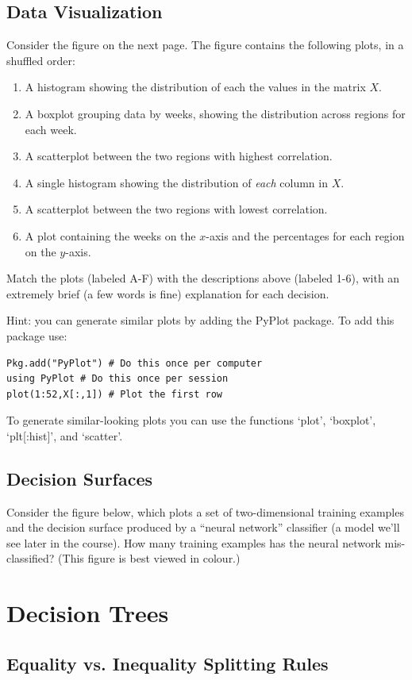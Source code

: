 \documentclass{article}
\def\blu#1{{\color{blu}#1}}
\def\enum#1{\begin{enumerate}#1\end{enumerate}}
\begin{document}
\subsection{Data Visualization}

Consider the figure on the next page.
The figure contains the following plots, in a shuffled order:
\enum{
\item A histogram showing the distribution of each the values in the matrix $X$.
\item A boxplot grouping data by weeks, showing the distribution across regions for each week.
\item A scatterplot between the two regions with highest correlation.
\item A single histogram showing the distribution of \emph{each} column in $X$.
\item A scatterplot between the two regions with lowest correlation.
\item A plot containing the weeks on the $x$-axis and the percentages for each region on the $y$-axis.
}
\blu{Match the plots (labeled A-F) with the descriptions above (labeled 1-6), with an extremely brief (a few words is fine) explanation for each decision.}

Hint: you can generate similar plots by adding the PyPlot package. To add this package use:
\begin{verbatim}
Pkg.add("PyPlot") # Do this once per computer
using PyPlot # Do this once per session
plot(1:52,X[:,1]) # Plot the first row
\end{verbatim}
To generate similar-looking plots you can use the functions `plot', `boxplot', `plt[:hist]', and `scatter'.


\subsection{Decision Surfaces}

Consider the figure below, which plots a set of two-dimensional training examples and the decision surface produced by a ``neural network'' classifier (a model we'll see later in the course).
\blu{How many training examples has the neural network mis-classified?} (This figure is best viewed in colour.)

\section{Decision Trees}

\subsection{Equality vs. Inequality Splitting Rules}
\end{document}
